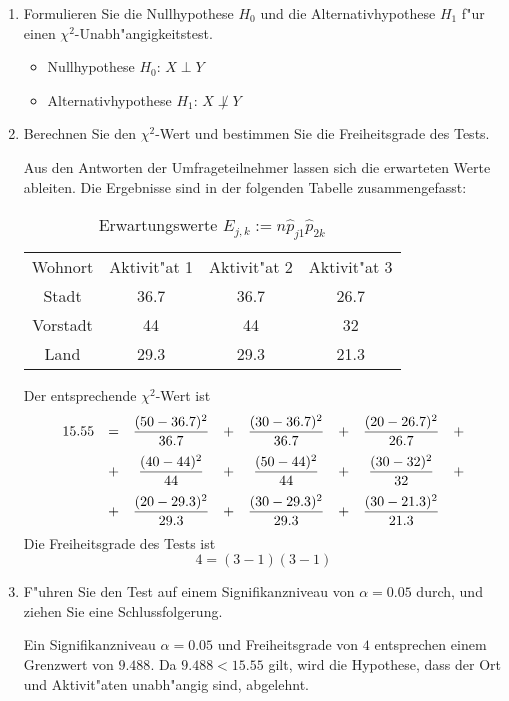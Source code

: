 \begin{enumerate}
    \item Formulieren Sie die Nullhypothese $H_0$ und die Alternativhypothese
        $H_1$ f"ur einen $\chi^2$-Unabh"angigkeitstest.
        \begin{itemize}[-]
            \item Nullhypothese $H_0$: $X \perp Y$
            \item Alternativhypothese $H_1$: $X \not\perp Y$
        \end{itemize}
    \item Berechnen Sie den $\chi^2$-Wert und bestimmen Sie die Freiheitsgrade des Tests.

        Aus den Antworten der Umfrageteilnehmer lassen sich die erwarteten
        Werte ableiten. Die Ergebnisse sind in der folgenden Tabelle
        zusammengefasst:

        \begin{table}[h]
            \centering
            \begin{tabular}{|c|c|c|c|}
                \hline
                Wohnort  & Aktivit"at 1 & Aktivit"at 2 & Aktivit"at 3 \\
                Stadt    & 36.7         & 36.7         & 26.7         \\
                Vorstadt & 44           & 44           & 32           \\
                Land     & 29.3         & 29.3         & 21.3         \\ \hline
            \end{tabular}
            \caption{Erwartungswerte $E_{j,k} := n\hat{p}_{j1}\hat{p}_{2k}$}
        \end{table}

        Der entsprechende $\chi^2$-Wert ist
        \begin{equation*}
            \begin{array}[t]{rccccccl}
                15.55 &=&\dfrac{(50 - 36.7)^2}{36.7} &+& \dfrac{(30 - 36.7)^2}{36.7} &+& \dfrac{(20 - 26.7)^2}{26.7} &+ \\[10pt]
                      &+& \dfrac{(40 - 44)^2}{44}     &+& \dfrac{(50 - 44)^2}{44}     &+& \dfrac{(30 - 32)^2}{32}     &+ \\[10pt]
                      &+& \dfrac{(20 - 29.3)^2}{29.3} &+& \dfrac{(30 - 29.3)^2}{29.3} &+& \dfrac{(30 - 21.3)^2}{21.3}
               \end{array} \\[10pt]
        \end{equation*}
        Die Freiheitsgrade des Tests ist
        \begin{equation*}
            4 = (3 - 1)(3 - 1)
        \end{equation*}
    \item F"uhren Sie den Test auf einem Signifikanzniveau von $\alpha = 0.05$
        durch, und ziehen Sie eine Schlussfolgerung.

        Ein Signifikanzniveau $\alpha = 0.05$ und Freiheitsgrade von $4$
        entsprechen einem Grenzwert von $9.488$. Da $9.488 < 15.55$ gilt, wird
        die Hypothese, dass der Ort und Aktivit"aten unabh"angig sind,
        abgelehnt.
\end{enumerate}

